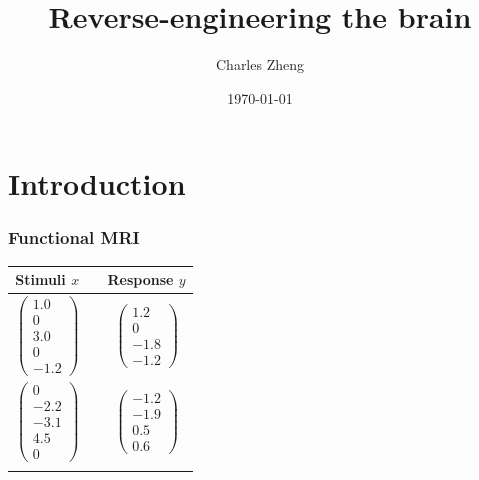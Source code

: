 \documentclass{beamer}
\title[Proposal]{Reverse-engineering the brain}
\author{Charles Zheng} %
\institute[Stanford] %
{Stanford University}
\date{\today} %
\begin{document}
\begin{frame}
\titlepage %
\end{frame}

\section{Introduction}
{

}

\begin{frame}
\frametitle{Functional MRI}
\begin{center}
\begin{tabular}{ccc}
\hline
Stimuli $x$ & & Response $y$\\ \hline
$\begin{pmatrix}1.0 \\ 0 \\ 3.0 \\ 0\\ -1.2\end{pmatrix}$ & \hspace{1in} & $\begin{pmatrix}1.2 \\ 0 \\ -1.8\\ -1.2\end{pmatrix}$ \\ \hline
$\begin{pmatrix}0 \\ -2.2 \\ -3.1 \\ 4.5\\ 0\end{pmatrix}$ & \hspace{1in} & $\begin{pmatrix}-1.2 \\ -1.9\\ 0.5\\ 0.6\end{pmatrix}$ \\ \hline
\hspace{1in} & \hspace{1in} & \hspace{1in}
\end{tabular}
\end{center}
\end{frame}

{

}
\end{document}
